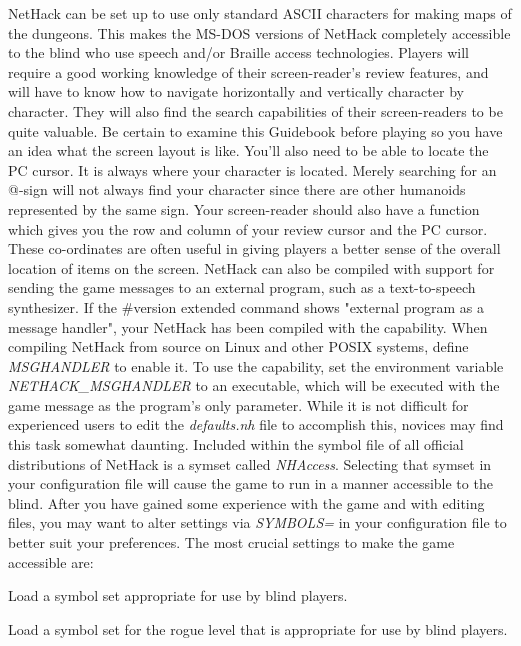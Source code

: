 NetHack can be set up to use only standard ASCII characters for making
maps of the dungeons. This makes the MS-DOS versions of NetHack completely
accessible to the blind who use speech and/or Braille access technologies.
Players will require a good working knowledge of their screen-reader's
review features, and will have to know how to navigate horizontally and
vertically character by character. They will also find the search
capabilities of their screen-readers to be quite valuable. Be certain to
examine this Guidebook before playing so you have an idea what the screen
layout is like. You'll also need to be able to locate the PC cursor. It is
always where your character is located. Merely searching for an @-sign will
not always find your character since there are other humanoids represented
by the same sign. Your screen-reader should also have a function which
gives you the row and column of your review cursor and the PC cursor.
These co-ordinates are often useful in giving players a better sense of the
overall location of items on the screen.
NetHack can also be compiled with support for sending the game messages
to an external program, such as a text-to-speech synthesizer. If the \#version
extended command shows "external program as a message handler", your NetHack
has been compiled with the capability. When compiling NetHack from source
on Linux and other POSIX systems, define {\it MSGHANDLER\/} to enable it. To use
the capability, set the environment variable {\it NETHACK\_MSGHANDLER\/} to an
executable, which will be executed with the game message as the program's
only parameter.
While it is not difficult for experienced users to edit the {\it defaults.nh\/}
file to accomplish this, novices may find this task somewhat daunting.
Included within the symbol file of all official distributions of NetHack 
is a symset called {\it NHAccess\/}.  Selecting that symset in your
configuration file will cause the game to run in a manner accessible 
to the blind. After you have gained some experience with the game 
and with editing files, you may want to alter settings via {\it SYMBOLS=\/} 
in your configuration file to better suit your preferences. 
The most crucial settings to make the game accessible are:
\blist{}
\item[\ib{symset:NHAccess}]
Load a symbol set appropriate for use by blind players.
\item[\ib{roguesymset:NHAccess}]
Load a symbol set for the rogue level that is appropriate for 
use by blind players.
\item[\ib{menustyle:traditional}]

